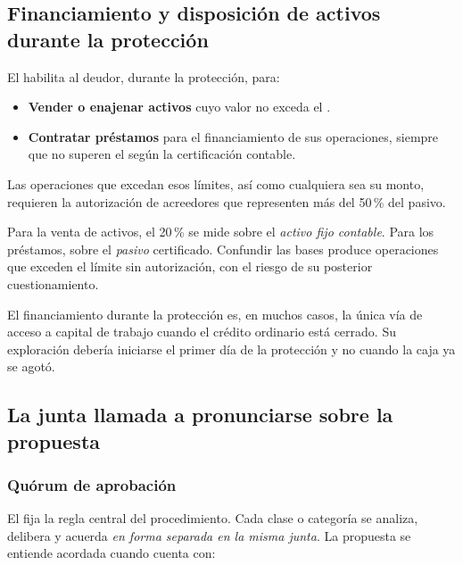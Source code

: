 \subsection{Financiamiento y disposición de activos durante la protección}

El  habilita al deudor, durante la protección, para:

\begin{itemize}
  \item \textbf{Vender o enajenar activos} cuyo valor no exceda el .
  \item \textbf{Contratar préstamos} para el financiamiento de sus operaciones, siempre que
  no superen el  según la certificación contable.
\end{itemize}

Las operaciones que excedan esos límites, así como  cualquiera sea su monto, requieren la autorización de acreedores que
representen más del 50\,\% del pasivo.

\begin{alerta}
Para la venta de activos, el 20\,\% se mide sobre el \emph{activo fijo contable}. Para los
préstamos, sobre el \emph{pasivo} certificado. Confundir las bases produce operaciones que
exceden el límite sin autorización, con el riesgo de su posterior cuestionamiento.
\end{alerta}

\begin{practica}
El financiamiento durante la protección es, en muchos casos, la única vía de acceso a
capital de trabajo cuando el crédito ordinario está cerrado. Su exploración debería
iniciarse el primer día de la protección y no cuando la caja ya se agotó.
\end{practica}

\subsection{La junta llamada a pronunciarse sobre la propuesta}

\subsubsection{Quórum de aprobación}

El  fija la regla central del procedimiento. Cada clase o categoría se analiza,
delibera y acuerda \emph{en forma separada en la misma junta}. La propuesta se entiende
acordada cuando cuenta con:

